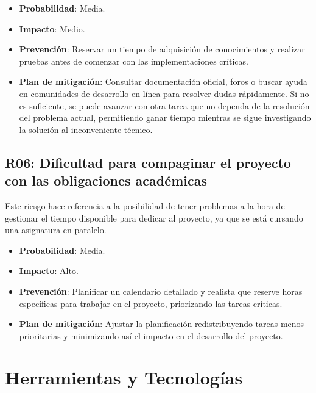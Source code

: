 \begin{itemize}
    \item \textbf{Probabilidad}: Media.
    \item \textbf{Impacto}: Medio.
    \item \textbf{Prevención}: Reservar un tiempo de adquisición de conocimientos y realizar pruebas antes de comenzar con las implementaciones críticas.
    \item \textbf{Plan de mitigación}: Consultar documentación oficial, foros o buscar ayuda en comunidades de desarrollo en línea para resolver dudas rápidamente. Si no es suficiente, se puede avanzar con otra tarea que no dependa de la resolución del problema actual, permitiendo ganar tiempo mientras se sigue investigando la solución al inconveniente técnico.
\end{itemize}

\subsection*{R06: Dificultad para compaginar el proyecto con las obligaciones académicas}
Este riesgo hace referencia a la posibilidad de tener problemas a la hora de gestionar el tiempo disponible para dedicar al proyecto, ya que se está cursando una asignatura en paralelo.

\begin{itemize}
    \item \textbf{Probabilidad}: Media.
    \item \textbf{Impacto}: Alto.
    \item \textbf{Prevención}: Planificar un calendario detallado y realista que reserve horas específicas para trabajar en el proyecto, priorizando las tareas críticas.
    \item \textbf{Plan de mitigación}: Ajustar la planificación redistribuyendo tareas menos prioritarias y minimizando así el impacto en el desarrollo del proyecto.
\end{itemize}



\section{Herramientas y Tecnologías}

